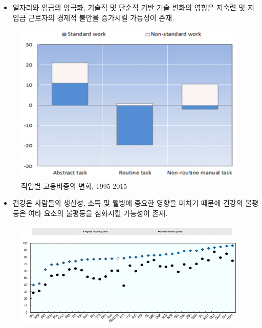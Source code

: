 \documentclass[aspectratio=169,xcolor=dvipsnames,handout]{beamer}
\begin{document}
\begin{frame}{}
    \begin{itemize}
        \item 일자리와 임금의 양극화, 기술직 및 단순직 기반 기술 변화의 영향은 저숙련 및 저임금 근로자의 경제적 불안을 증가시킬 가능성이 존재.
    \end{itemize}
    \begin{figure}
        \centering
        \includegraphics[scale=.3]{pic/tpin2.8.png}
        \caption{직업별 고용비중의 변화, 1995-2015}
    \end{figure}
\end{frame}

\begin{frame}{}
    \begin{itemize}
        \item 건강은 사람들의 생산성, 소득 및 웰빙에 중요한 영향을 미치기 때문에 건강의 불평등은 여타 요소의 불평등을 심화시킬 가능성이 존재.
    \end{itemize}
    \begin{figure}
        \centering
        \includegraphics[scale=.3]{pic/tpin2.9.png}
        \caption{}
    \end{figure}
\end{frame}
\end{document}
